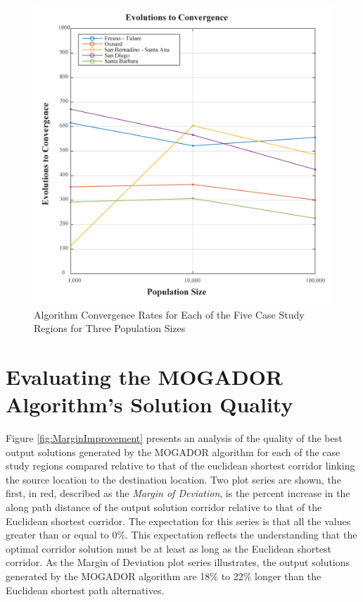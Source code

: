     \begin{figure}[!h]
        \begin{center}
        \includegraphics[width=5.5in]{figures/Evolutions.png}
        \caption{Algorithm Convergence Rates for Each of the Five Case Study Regions for Three Population Sizes}
        \label{fig:Evolutions}
        \end{center}
    \end{figure}

\section{Evaluating the MOGADOR Algorithm's Solution Quality}

Figure \ref{fig:MarginImprovement} presents an analysis of the quality of the best output solutions generated by the MOGADOR algorithm for each of the case study regions compared relative to that of the euclidean shortest corridor linking the source location to the destination location. Two plot series are shown, the first, in red, described as the \textit{Margin of Deviation}, is the percent increase in the along path distance of the output solution corridor relative to that of the Euclidean shortest corridor. The expectation for this series is that all the values greater than or equal to 0\%. This expectation reflects the understanding that the optimal corridor solution must be at least as long as the Euclidean shortest corridor. As the Margin of Deviation plot series illustrates, the output solutions generated by the MOGADOR algorithm are 18\% to 22\% longer than the Euclidean shortest path alternatives.

